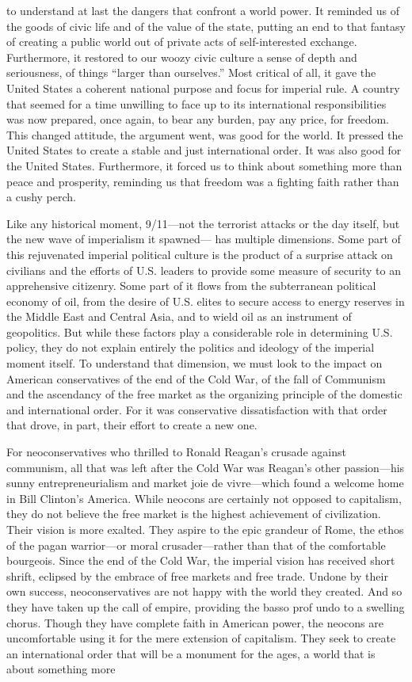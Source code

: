 to understand at last the dangers that confront a world power. It reminded us of the goods of civic life and of the value of the state, putting an end to that fantasy of creating a public world out of private acts of self-interested exchange. Furthermore, it restored to our woozy civic culture a sense of depth and seriousness, of things “larger than ourselves.” Most critical of all, it gave the United States a coherent national purpose and focus for imperial rule. A country that seemed for a time unwilling to face up to its international responsibilities was now prepared, once again, to bear any burden, pay any price, for freedom. This changed attitude, the argument went, was good for the world. It pressed the United States to create a stable and just international order. It was also good for the United States. Furthermore, it forced us to think about something more than peace and prosperity, reminding us that freedom was a fighting faith rather than a cushy perch.{\par} Like any historical moment, 9/11—not the terrorist attacks or the day itself, but the new wave of imperialism it spawned— has multiple dimensions. Some part of this rejuvenated imperial political culture is the product of a surprise attack on civilians and the efforts of U.S. leaders to provide some measure of security to an apprehensive citizenry. Some part of it flows from the subterranean political economy of oil, from the desire of U.S. elites to secure access to energy reserves in the Middle East and Central Asia, and to wield oil as an instrument of geopolitics. But while these factors play a considerable role in determining U.S. policy, they do not explain entirely the politics and ideology of the imperial moment itself. To understand that dimension, we must look to the impact on American conservatives of the end of the Cold War, of the fall of Communism and the ascendancy of the free market as the organizing principle of the domestic and international order. For it was conservative dissatisfaction with that order that drove, in part, their effort to create a new one.{\par} For neoconservatives who thrilled to Ronald Reagan’s crusade against communism, all that was left after the Cold War was Reagan’s other passion—his sunny entrepreneurialism and market joie de vivre—which found a welcome home in Bill Clinton’s America. While neocons are certainly not opposed to capitalism, they do not believe the free market is the highest achievement of civilization. Their vision is more exalted. They aspire to the epic grandeur of Rome, the ethos of the pagan warrior—or moral crusader—rather than that of the comfortable bourgeois. Since the end of the Cold War, the imperial vision has received short shrift, eclipsed by the embrace of free markets and free trade. Undone by their own success, neoconservatives are not happy with the world they created. And so they have taken up the call of empire, providing the basso prof undo to a swelling chorus. Though they have complete faith in American power, the neocons are uncomfortable using it for the mere extension of capitalism. They seek to create an international order that will be a monument for the ages, a world that is about something more 